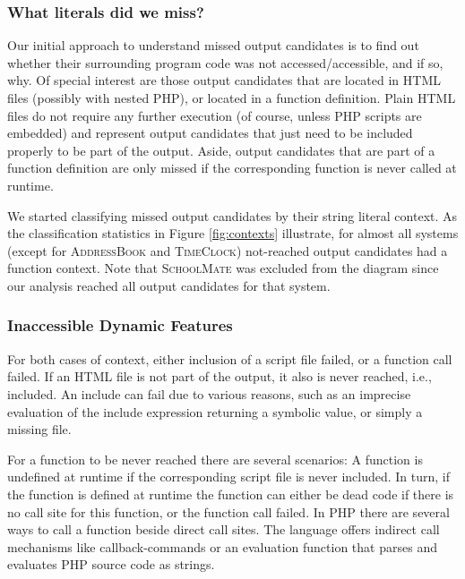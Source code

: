 \documentclass[preprint]{sig-alternate-05-2015}
\begin{document}
\subsubsection{What literals did we miss?}
\label{WhatLiteralsDidWeMiss?}
Our initial approach to understand missed output candidates is to find out whether their surrounding program code was not accessed/accessible, and if so, why. Of special interest are those output candidates that are located in HTML files (possibly with nested PHP), or located in a function definition. Plain HTML files do not require any further execution (of course, unless PHP scripts are embedded) and represent output candidates that just need to be included properly to be part of the output. Aside, output candidates that are part of a function definition are only missed if the corresponding function is never called at runtime.

We started classifying missed output candidates by their string literal context. As the classification statistics in Figure \ref{fig:contexts} illustrate, for almost all systems (except for \textsc{AddressBook} and \textsc{TimeClock}) not-reached output candidates had a function context. Note that \textsc{SchoolMate} was excluded from the diagram since our analysis reached all output candidates for that system.

%		

\subsubsection{Inaccessible Dynamic Features}
\label{sec:inaccessible}
For both cases of context, either inclusion of a script file failed, or a function call failed. If an HTML file is not part of the output, it also is never reached, i.e., included. An include can fail due to various reasons, such as an imprecise evaluation of the include expression returning a symbolic value, or simply a missing file. 

For a function to be never reached there are several scenarios: A function is undefined at runtime if the corresponding script file is never included. In turn, if the function is defined at runtime the function can either be dead code if there is no call site for this function, or the function call failed. In PHP there are several ways to call a function beside direct call sites. The language offers indirect call mechanisms like callback-commands or an evaluation function that parses and evaluates PHP source code as strings.
\end{document}
